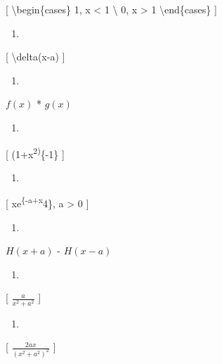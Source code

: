 \documentclass[
]{article}
\providecommand{\tightlist}{%
  \setlength{\itemsep}{0pt}\setlength{\parskip}{0pt}}
\begin{document}
{{{{[} \textbackslash begin\{cases\} 1, \textbar x\textbar{} \textless{} 1
\textbackslash{} 0, \textbar x\textbar{} \textgreater{} 1
\textbackslash end\{cases\} {]}

\begin{enumerate}
\def\labelenumi{\arabic{enumi}.}
\setcounter{enumi}{9}
\tightlist
\item
\end{enumerate}

{[} \textbackslash delta(x-a) {]}

\begin{enumerate}
\def\labelenumi{\arabic{enumi}.}
\setcounter{enumi}{10}
\tightlist
\item
\end{enumerate}

\(f(x)\) * \(g(x)\)

\begin{enumerate}
\def\labelenumi{\arabic{enumi}.}
\setcounter{enumi}{11}
\tightlist
\item
\end{enumerate}

{[} (1+x\textsuperscript{2)}\{-1\} {]}

\begin{enumerate}
\def\labelenumi{\arabic{enumi}.}
\setcounter{enumi}{12}
\tightlist
\item
\end{enumerate}

{[} xe\textsuperscript{\{-a+x}4\}, a \textgreater{} 0 {]}

\begin{enumerate}
\def\labelenumi{\arabic{enumi}.}
\setcounter{enumi}{13}
\tightlist
\item
\end{enumerate}

\(H(x+a)\) - \(H(x-a)\)

\begin{enumerate}
\def\labelenumi{\arabic{enumi}.}
\setcounter{enumi}{14}
\tightlist
\item
\end{enumerate}

{[} \(\frac{a}{x^2+a^2}\) {]}

\begin{enumerate}
\def\labelenumi{\arabic{enumi}.}
\setcounter{enumi}{15}
\tightlist
\item
\end{enumerate}

{[} \(\frac{2ax}{(x^2+a^2)^2}\) {]}

}}}
\end{document}
